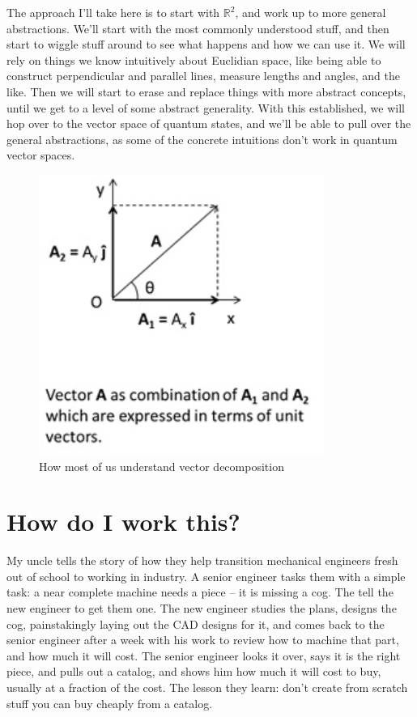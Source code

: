 \documentclass[
]{book}
\begin{document}
The approach I'll take here is to start with \(\mathbb{R}^2\), and work up to more general abstractions. We'll start with the most commonly understood stuff, and then start to wiggle stuff around to see what happens and how we can use it. We will rely on things we know intuitively about Euclidian space, like being able to construct perpendicular and parallel lines, measure lengths and angles, and the like. Then we will start to erase and replace things with more abstract concepts, until we get to a level of some abstract generality. With this established, we will hop over to the vector space of quantum states, and we'll be able to pull over the general abstractions, as some of the concrete intuitions don't work in quantum vector spaces.

\begin{figure}

{\centering \includegraphics[width=0.75\linewidth,height=0.75\textheight]{images/simple-vector-orthogonal-unit-vectors} 

}

\caption{How most of us understand vector decomposition}\label{fig:unnamed-chunk-4}
\end{figure}

\hypertarget{how-do-i-work-this}{%
\chapter{How do I work this?}\label{how-do-i-work-this}}

My uncle tells the story of how they help transition mechanical engineers fresh out of school to working in industry. A senior engineer tasks them with a simple task: a near complete machine needs a piece -- it is missing a cog. The tell the new engineer to get them one. The new engineer studies the plans, designs the cog, painstakingly laying out the CAD designs for it, and comes back to the senior engineer after a week with his work to review how to machine that part, and how much it will cost. The senior engineer looks it over, says it is the right piece, and pulls out a catalog, and shows him how much it will cost to buy, usually at a fraction of the cost. The lesson they learn: don't create from scratch stuff you can buy cheaply from a catalog.
\end{document}
